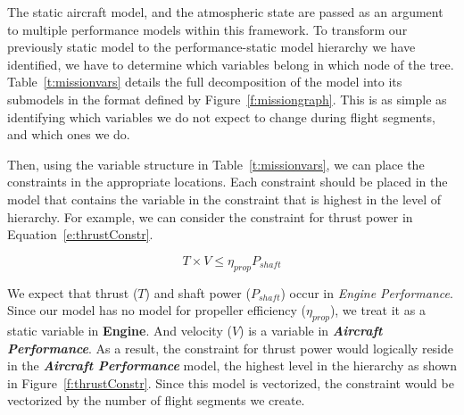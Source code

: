 The static aircraft model, and the atmospheric state are passed as an argument to multiple
performance models within this framework. To transform our previously static model to
the performance-static model hierarchy we have identified,
we have to determine which variables
belong in which node of the tree. Table~\ref{t:missionvars} details the full
decomposition of the model into its submodels in the format defined
by Figure~\ref{f:missiongraph}. This is as simple as identifying which variables
we do not expect to change during flight segments, and which ones we do.

\begin{center}
    
    \label{t:missionvars}
\end{center}

Then, using the variable structure in Table~\ref{t:missionvars}, we can place the
constraints in the appropriate locations. Each constraint should be placed
in the model that contains the variable in the constraint that is highest in the level of hierarchy. For example,
we can consider the constraint for thrust power in Equation~\ref{e:thrustConstr}.

\begin{equation}
    \label{e:thrustConstr}
    T \times V \leq \eta_{prop} P_{shaft}
\end{equation}

We expect that thrust ($T$) and shaft power ($P_{shaft}$) occur
in \textit{Engine Performance}. Since our model has no model for propeller efficiency ($\eta_{prop}$), we treat it
as a static variable in \textbf{Engine}. And velocity ($V$) is a variable in \textbf{\textit{Aircraft {Performance}}}.
As a result, the constraint for thrust power would logically reside in the \textbf{\textit{Aircraft {Performance}}}
model, the highest level in the hierarchy as shown in Figure~\ref{f:thrustConstr}. Since this model is vectorized,
the constraint would be vectorized by the number of flight segments we create.

